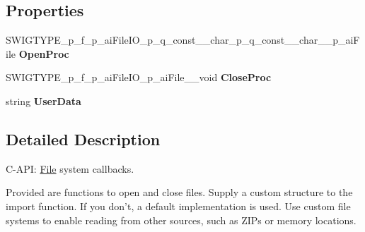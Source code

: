 \subsection*{Properties}
\begin{DoxyCompactItemize}
\item 
\hypertarget{structai_file_i_o_af0a03988a7cd006e867f2577406b009f}{S\+W\+I\+G\+T\+Y\+P\+E\+\_\+p\+\_\+f\+\_\+p\+\_\+ai\+File\+I\+O\+\_\+p\+\_\+q\+\_\+const\+\_\+\+\_\+char\+\_\+p\+\_\+q\+\_\+const\+\_\+\+\_\+char\+\_\+\+\_\+p\+\_\+ai\+File {\bfseries Open\+Proc}}\label{structai_file_i_o_af0a03988a7cd006e867f2577406b009f}

\item 
\hypertarget{structai_file_i_o_a26d07a6efd0f3d2481268747163fcabf}{S\+W\+I\+G\+T\+Y\+P\+E\+\_\+p\+\_\+f\+\_\+p\+\_\+ai\+File\+I\+O\+\_\+p\+\_\+ai\+File\+\_\+\+\_\+void {\bfseries Close\+Proc}}\label{structai_file_i_o_a26d07a6efd0f3d2481268747163fcabf}

\item 
\hypertarget{structai_file_i_o_a793bda1596f4a4c938f98c8e990ce304}{string {\bfseries User\+Data}}\label{structai_file_i_o_a793bda1596f4a4c938f98c8e990ce304}

\end{DoxyCompactItemize}


\subsection{Detailed Description}
C-\/\+A\+P\+I\+: \hyperlink{class_file}{File} system callbacks. 

Provided are functions to open and close files. Supply a custom structure to the import function. If you don't, a default implementation is used. Use custom file systems to enable reading from other sources, such as Z\+I\+Ps or memory locations. 

